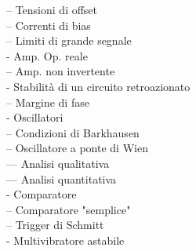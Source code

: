 \documentclass{article}
\begin{document}
-- Tensioni di offset\\
-- Correnti di bias\\
-- Limiti di grande segnale\\
- Amp. Op. reale\\
-- Amp. non invertente\\
- Stabilità di un circuito retroazionato\\
-- Margine di fase\\
- Oscillatori\\
-- Condizioni di Barkhausen\\
-- Oscillatore a ponte di Wien\\
--- Analisi qualitativa\\
--- Analisi quantitativa\\
- Comparatore\\
-- Comparatore "semplice"\\
-- Trigger di Schmitt\\
- Multivibratore astabile
\end{document}
